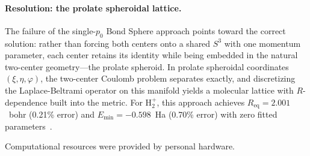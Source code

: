 \documentclass[aps,pra,twocolumn,superscriptaddress,longbibliography]{revtex4-2}
\begin{document}
\paragraph{Resolution: the prolate spheroidal lattice.}
The failure of the single-$p_0$ Bond Sphere approach points toward the
correct solution: rather than forcing both centers onto a shared $S^3$
with one momentum parameter, each center retains its identity while
being embedded in the natural two-center geometry---the prolate
spheroid.  In prolate spheroidal coordinates $(\xi, \eta, \varphi)$,
the two-center Coulomb problem separates exactly, and discretizing
the Laplace-Beltrami operator on this manifold yields a molecular
lattice with $R$-dependence built into the metric.  For H$_2^+$, this
approach achieves $R_{\mathrm{eq}} = 2.001$~bohr (0.21\% error) and
$E_{\min} = -0.598$~Ha (0.70\% error) with zero fitted
parameters~\cite{loutey_paper11}.


\begin{acknowledgments}
Computational resources were provided by personal hardware.
\end{acknowledgments}
\end{document}
